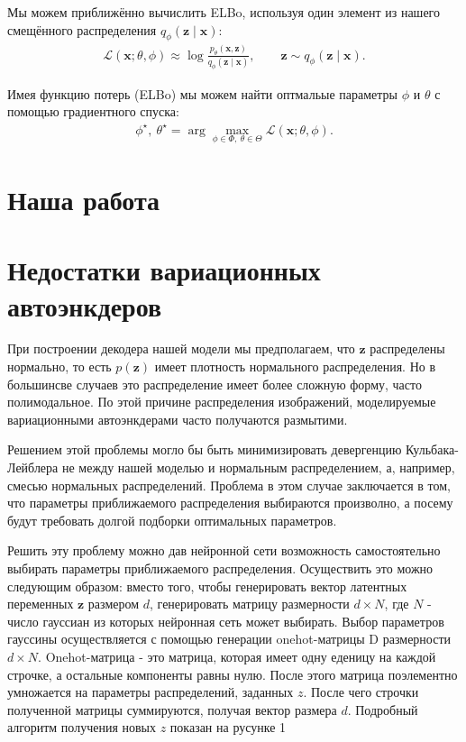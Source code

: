 \documentclass{article}
\begin{document}
Мы можем приближённо вычислить ELBo, используя один элемент из нашего смещённого распределения $q_\phi(\mathbf{z} \mid \mathbf{x})$:
\begin{align*}
   \mathcal{L} (\mathbf{x}; \theta, \phi) \approx  \log \frac{
      p_\theta (\mathbf{x}, \mathbf{z})
    }{
      q_\phi (\mathbf{z} \mid \mathbf{x})
    }, \qquad \mathbf{z} \sim q_\phi (\mathbf{z} \mid \mathbf{x}). 
\end{align*}

Имея функцию потерь (ELBo) мы можем найти оптмальые параметры $\phi$ и $\theta$ с помощью градиентного спуска:
\begin{align*}
  \phi^\star,~\theta^\star = \arg \max_{\phi \in \Phi,~\theta \in \Theta}
  \mathcal{L} (\mathbf{x}; \theta, \phi).  
\end{align*}

\section{Наша работа}

\section{Недостатки вариационных автоэнкдеров}

При построении декодера нашей модели мы предполагаем, что $\mathbf{z}$ распределены нормально, то есть $p(\mathbf{z})$ имеет плотность нормального
распределения. Но в большинсве случаев это распределение имеет более сложную форму, часто полимодальное. По этой причине распределения изображений,
моделируемые вариационными автоэнкдерами часто получаются размытими.

Решением этой проблемы могло бы быть минимизировать девергенцию Кульбака-Лейблера не между нашей моделью и нормальным распределением, а, например,
смесью нормальных распределений. Проблема в этом случае заключается в том, что параметры приближаемого распределения выбираются произволно, а посему
будут требовать долгой подборки оптимальных параметров.

Решить эту проблему можно дав нейронной сети возможность самостоятельно выбирать параметры приближаемого распределения. Осуществить это можно
следующим образом: вместо того, чтобы генерировать вектор латентных переменных $\mathbf{z}$ размером $d$, генерировать матрицу размерности $d \times N$, где
$N$ - число гауссиан из которых нейронная сеть может выбирать. Выбор параметров гауссины осуществляется с помощью генерации onehot-матрицы D размерности 
$d \times N$. Onehot-матрица - это матрица, которая имеет одну еденицу на каждой строчке, а остальные компоненты равны нулю. После этого матрица поэлементно умножается
на параметры распределений, заданных $z$. После чего строчки полученной матрицы суммируются, получая вектор размера $d$. Подробный алгоритм получения
новых $z$ показан на русунке 1\label{fig:musigma}
\end{document}
